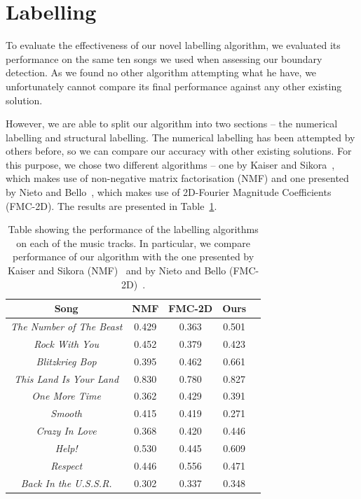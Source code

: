 \section{Labelling}

To evaluate the effectiveness of our novel labelling algorithm, we evaluated its performance on the same ten songs we used when assessing our boundary detection. As we found no other algorithm attempting what he have, we unfortunately cannot compare its final performance against any other existing solution. 

However, we are able to split our algorithm into two sections -- the numerical labelling and structural labelling. The numerical labelling has been attempted by others before, so we can compare our accuracy with other existing solutions. For this purpose, we chose two different algorithms -- one by Kaiser and Sikora~\cite{Sikora}, which makes use of non-negative matrix factorisation (NMF) and one presented by Nieto and Bello~\cite{Bello}, which makes use of  2D-Fourier Magnitude Coefficients (FMC-2D). The results are presented in Table~\ref{table:labellingnumeric}.


\begin{table}
\begin{center}
\begin{tabular}{| c | c | c | c | c | } \hline 
Song  											& 	NMF				&  FMC-2D		&  Ours		\\ \hline \hline
\textit{The Number of The Beast} 	&	0.429			& 	0.363  			&  0.501	\\ \hline
\textit{Rock With You}						&	0.452			&  0.379			&  0.423	\\ \hline
\textit{Blitzkrieg Bop} 						&	0.395			&  0.462  			&  0.661 	\\ \hline
\textit{This Land Is Your Land} 		&	0.830			&  0.780			&  0.827 	\\ \hline
\textit{One More Time}					&	0.362			&  0.429    			&  0.391 	\\ \hline
\textit{Smooth}								&	0.415			&  0.419  			&  0.271 	\\ \hline
\textit{Crazy In Love}						&	0.368			&  0.420  			&  0.446  	\\ \hline
\textit{Help!}									&	0.530			&  0.445		   	&  0.609 	\\ \hline
\textit{Respect}								&	0.446			&  0.556  			&  0.471 	\\ \hline
\textit{Back In the U.S.S.R.}				&	0.302			&  0.337 			&  0.348	\\ \hline

\end{tabular}
\caption{Table showing the performance of the labelling algorithms on each of the music tracks. In particular, we compare performance of our algorithm with the one presented by Kaiser and Sikora (NMF)~\cite{Sikora} and by Nieto and Bello (FMC-2D)~\cite{Bello}.}
\label{table:labellingnumeric}
\end{center}
\end{table}

